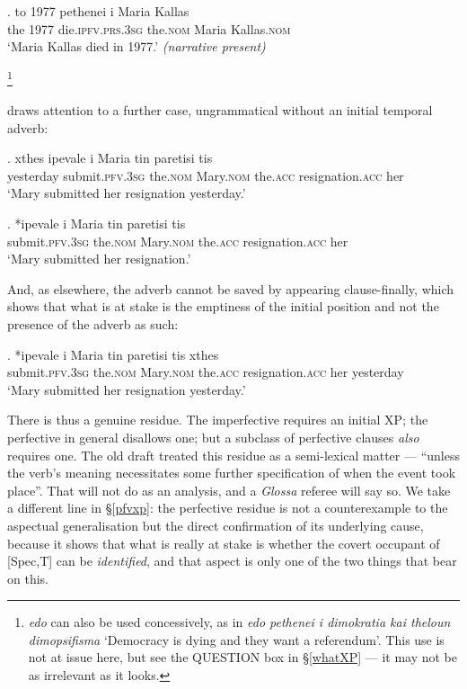 \documentclass[11pt]{article}
\newcommand{\pfv}{\textsc{pfv}\xspace}
\newcommand{\ipfv}{\textsc{ipfv}\xspace}
\begin{document}
\exg. to 1977 pethenei i Maria Kallas\\
the 1977 die.\ipfv.\textsc{prs}.3\textsc{sg} the.\textsc{nom} Maria Kallas.\textsc{nom}\\ \label{greek256}
`Maria Kallas died in 1977.' \emph{(narrative present)}

\footnote{\emph{edo} can also be used concessively, as in \emph{edo pethenei i dimokratia kai theloun dimopsifisma} `Democracy is dying and they want a referendum'.  This use is not at issue here, but see the QUESTION box in \S\ref{whatXP} --- it may not be as irrelevant as it looks.}

\citet{sitaridou:12} draws attention to a further case, ungrammatical without an initial temporal adverb:

\exg. xthes ipevale i Maria tin paretisi tis\\
yesterday submit.\pfv.3\textsc{sg} the.\textsc{nom} Mary.\textsc{nom} the.\textsc{acc} resignation.\textsc{acc} her\\ \label{sitaridou3}
`Mary submitted her resignation yesterday.'

\exg. *ipevale i Maria tin paretisi tis\\
submit.\pfv.3\textsc{sg} the.\textsc{nom} Mary.\textsc{nom} the.\textsc{acc} resignation.\textsc{acc} her\\ \label{sitaridou4}
`Mary submitted her resignation.'

\hfill \citep[p.~583]{sitaridou:12}

And, as elsewhere, the adverb cannot be saved by appearing clause-finally, which shows that what is at stake is the emptiness of the initial position and not the presence of the adverb as such:

\exg. *ipevale i Maria tin paretisi tis xthes\\
submit.\pfv.3\textsc{sg} the.\textsc{nom} Mary.\textsc{nom} the.\textsc{acc} resignation.\textsc{acc} her yesterday\\ \label{sitaridou5}
`Mary submitted her resignation yesterday.'

There is thus a genuine residue.  The imperfective requires an initial XP; the perfective in general disallows one; but a subclass of perfective clauses \emph{also} requires one.  The old draft treated this residue as a semi-lexical matter --- ``unless the verb's meaning necessitates some further specification of when the event took place''.  That will not do as an analysis, and a \emph{Glossa} referee will say so.  We take a different line in \S\ref{pfvxp}: the perfective residue is not a counterexample to the aspectual generalisation but the direct confirmation of its underlying cause, because it shows that what is really at stake is whether the covert occupant of [Spec,T] can be \emph{identified}, and that aspect is only one of the two things that bear on this.
\end{document}
